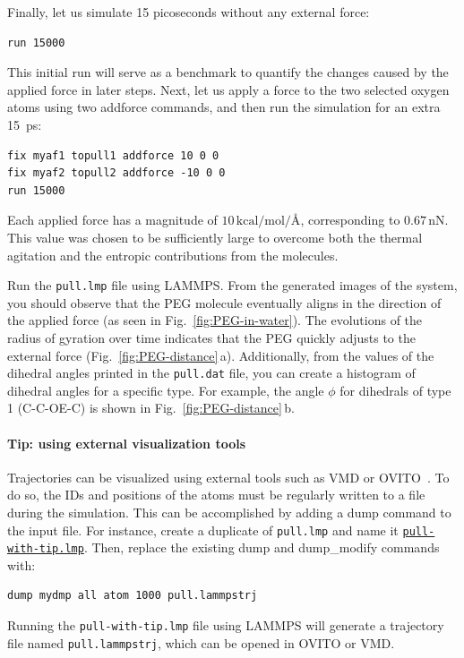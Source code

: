\documentclass[9pt,tutorial]{livecoms}
\newcommand{\lmpcmd}[1]{\colorbox{listing}{\textcolor{command}{\small{#1}}}} %
\newcommand{\flecmd}[1]{\textcolor{command}{\texttt{#1}}} %
\newcommand{\dwlcmd}[1]{\textcolor{download}{\texttt{#1}}} %
\newcommand{\filepath}{https://raw.githubusercontent.com/lammpstutorials/lammpstutorials-article/main/files/}
\begin{document}
Finally, let us simulate 15 picoseconds without any external force:
\begin{lstlisting}
run 15000
\end{lstlisting}
This initial run will serve as a benchmark to quantify the changes caused by
the applied force in later steps.  Next, let us apply a force to the two selected
oxygen atoms using two \lmpcmd{addforce} commands, and then run the simulation
for an extra 15~ps:
\begin{lstlisting}
fix myaf1 topull1 addforce 10 0 0
fix myaf2 topull2 addforce -10 0 0
run 15000
\end{lstlisting}
Each applied force has a magnitude of $10\,\text{kcal/mol/\AA{}}$, corresponding to $0.67\,\text{nN}$.
This value was chosen to be sufficiently large to overcome both the thermal agitation and
the entropic contributions from the molecules.

Run the \flecmd{pull.lmp} file using LAMMPS.  From the generated images of the system,
you should observe that the PEG molecule eventually aligns
in the direction of the applied force (as seen in Fig.~\ref{fig:PEG-in-water}).
The evolutions of the radius of gyration over
time indicates that the PEG quickly adjusts to the external force
(Fig.~\ref{fig:PEG-distance}\,a).  Additionally, from the values of the dihedral angles
printed in the \flecmd{pull.dat} file, you can create a histogram
of dihedral angles for a specific type.  For example, the angle $\phi$ for dihedrals
of type 1 (C-C-OE-C) is shown in Fig.~\ref{fig:PEG-distance}\,b.

\paragraph{Tip: using external visualization tools}
\label{tip-external-viz}

Trajectories can be visualized using external tools such as VMD or
OVITO~\cite{humphrey1996vmd, stukowski2009visualization}.  To do so, the IDs and
positions of the atoms must be regularly written to a file during the
simulation.  This can be accomplished by adding a \lmpcmd{dump} command
to the input file.  For instance, create a duplicate of
\flecmd{pull.lmp} and name it
\href{\filepath tutorial3/solution/pull-with-tip.lmp}{\dwlcmd{pull-with-tip.lmp}}.
Then, replace the existing \lmpcmd{dump} and \lmpcmd{dump\_modify} commands with:
\begin{lstlisting}
dump mydmp all atom 1000 pull.lammpstrj
\end{lstlisting}
Running the \flecmd{pull-with-tip.lmp} file using LAMMPS will generate a trajectory file
named \flecmd{pull.lammpstrj}, which can be opened in OVITO or VMD.
\end{document}
